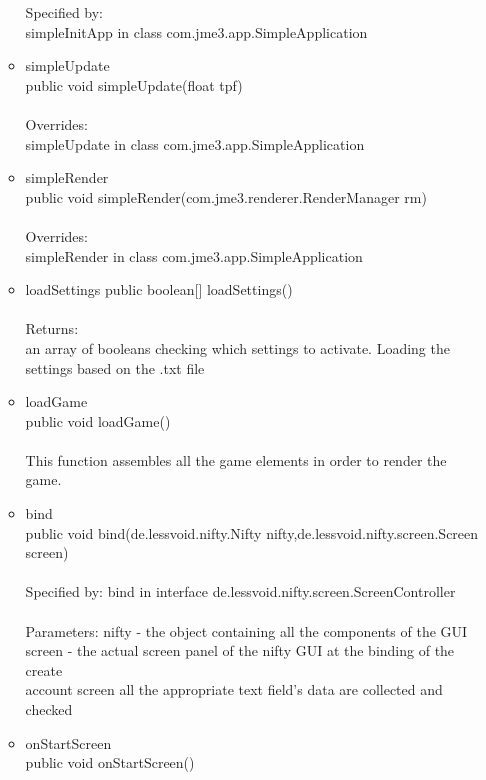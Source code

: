 \documentclass[letterpaper]{article}
\begin{document}
\begin{itemize}
\begin{itemize}
														Specified by: \\
														simpleInitApp in class com.jme3.app.SimpleApplication
												\item	simpleUpdate \\
														public void simpleUpdate(float tpf) \\ \\
														Overrides: \\
														simpleUpdate in class com.jme3.app.SimpleApplication
												\item	simpleRender \\
														public void simpleRender(com.jme3.renderer.RenderManager rm) \\ \\
														Overrides: \\
														simpleRender in class com.jme3.app.SimpleApplication
												\item	loadSettings
														public boolean[] loadSettings() \\ \\
														Returns: \\
														an array of booleans checking which settings to activate. Loading the settings based on the .txt file
												\item	loadGame \\
														public void loadGame() \\ \\
														This function assembles all the game elements in order to render the game.
												\item	bind \\
														public void bind(de.lessvoid.nifty.Nifty nifty,de.lessvoid.nifty.screen.Screen screen) \\ \\
														Specified by:
														bind in interface de.lessvoid.nifty.screen.ScreenController \\ \\
														Parameters:
														nifty - the object containing all the components of the GUI \\
														screen - the actual screen panel of the nifty GUI at the binding of the create \\ account screen all the appropriate text field's data are collected and checked
												\item	onStartScreen \\
														public void onStartScreen() \\ \\

\end{itemize}
\end{itemize}
\end{document}
